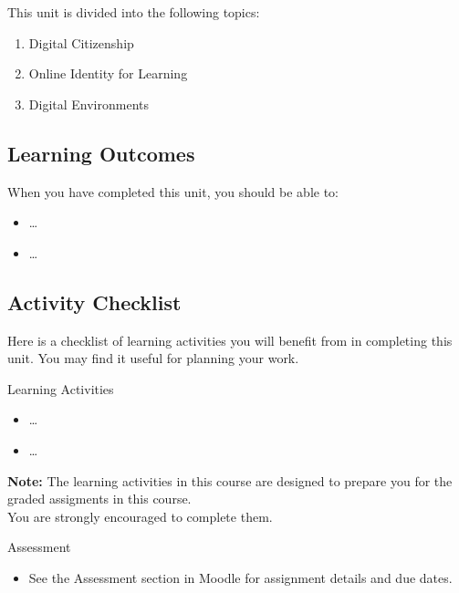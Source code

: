 \documentclass[
]{book}
\providecommand{\tightlist}{%
  \setlength{\itemsep}{0pt}\setlength{\parskip}{0pt}}
\theoremstyle{definition}
\theoremstyle{definition}
\theoremstyle{definition}
\theoremstyle{definition}
\theoremstyle{remark}
\begin{document}
This unit is divided into the following topics:

\begin{enumerate}
\def\labelenumi{\arabic{enumi}.}
\tightlist
\item
  Digital Citizenship
\item
  Online Identity for Learning
\item
  Digital Environments
\end{enumerate}

\hypertarget{learning-outcomes-4}{%
\subsection*{Learning Outcomes}\label{learning-outcomes-4}}

When you have completed this unit, you should be able to:

\begin{itemize}
\tightlist
\item
  \ldots{}
\item
  \ldots{}
\end{itemize}

\hypertarget{activity-checklist-4}{%
\subsection*{Activity Checklist}\label{activity-checklist-4}}

Here is a checklist of learning activities you will benefit from in completing this unit. You may find it useful for planning your work.

\begin{reflect}
{Learning Activities}

\begin{itemize}
\tightlist
\item
  \ldots{}
\item
  \ldots{}
\end{itemize}

\textbf{Note:} The learning activities in this course are designed to prepare you for the graded assigments in this course.\\
You are strongly encouraged to complete them.
\end{reflect}

\begin{assessment}
{Assessment}

\begin{itemize}
\tightlist
\item
  See the Assessment section in Moodle for assignment details and due dates.
\end{itemize}
\end{assessment}
\end{document}
